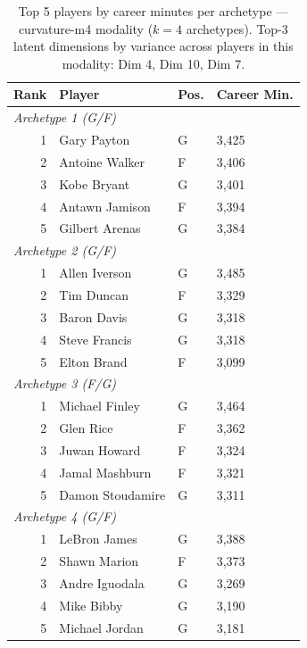\begin{table}[htbp]
  \centering\small
  \begin{tabular}{rlll}
    \toprule
    Rank & Player & Pos. & Career Min. \\
    \midrule
    \multicolumn{4}{l}{\textit{Archetype 1 (G/F)}} \\
    \midrule
    1 & Gary Payton & G & 3,425 \\
    2 & Antoine Walker & F & 3,406 \\
    3 & Kobe Bryant & G & 3,401 \\
    4 & Antawn Jamison & F & 3,394 \\
    5 & Gilbert Arenas & G & 3,384 \\
    \midrule[0.4pt]
    \multicolumn{4}{l}{\textit{Archetype 2 (G/F)}} \\
    \midrule
    1 & Allen Iverson & G & 3,485 \\
    2 & Tim Duncan & F & 3,329 \\
    3 & Baron Davis & G & 3,318 \\
    4 & Steve Francis & G & 3,318 \\
    5 & Elton Brand & F & 3,099 \\
    \midrule[0.4pt]
    \multicolumn{4}{l}{\textit{Archetype 3 (F/G)}} \\
    \midrule
    1 & Michael Finley & G & 3,464 \\
    2 & Glen Rice & F & 3,362 \\
    3 & Juwan Howard & F & 3,324 \\
    4 & Jamal Mashburn & F & 3,321 \\
    5 & Damon Stoudamire & G & 3,311 \\
    \midrule[0.4pt]
    \multicolumn{4}{l}{\textit{Archetype 4 (G/F)}} \\
    \midrule
    1 & LeBron James & G & 3,388 \\
    2 & Shawn Marion & F & 3,373 \\
    3 & Andre Iguodala & G & 3,269 \\
    4 & Mike Bibby & G & 3,190 \\
    5 & Michael Jordan & G & 3,181 \\
    \bottomrule
  \end{tabular}
  \caption{Top 5 players by career minutes per archetype --- curvature-m4 modality ($k=4$ archetypes). Top-3 latent dimensions by variance across players in this modality: Dim 4, Dim 10, Dim 7.}
  \label{tab:arch_reps_curvature_m4}
\end{table}

